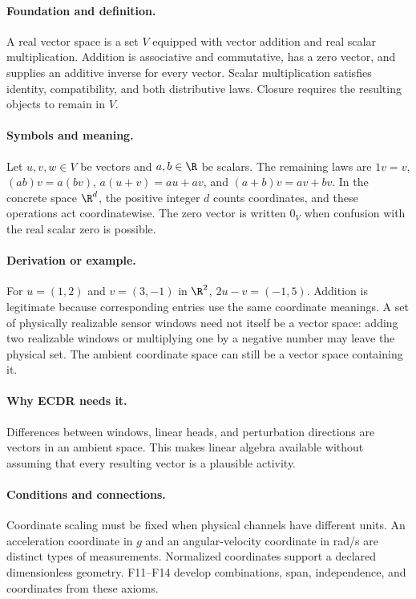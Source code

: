 \paragraph{Foundation and definition.}
A real vector space is a set $V$ equipped with vector addition and real
scalar multiplication. Addition is associative and commutative, has a
zero vector, and supplies an additive inverse for every vector. Scalar
multiplication satisfies identity, compatibility, and both distributive
laws. Closure requires the resulting objects to remain in $V$.
\paragraph{Symbols and meaning.}
Let $u,v,w\in V$ be vectors and $a,b\in\R$ be scalars. The remaining
laws are $1v=v$, $(ab)v=a(bv)$,
$a(u+v)=au+av$, and $(a+b)v=av+bv$. In the concrete space $\R^d$,
the positive integer $d$ counts coordinates, and these operations act
coordinatewise. The zero vector is written $0_V$ when confusion with
the real scalar zero is possible.
\paragraph{Derivation or example.}
For $u=(1,2)$ and $v=(3,-1)$ in $\R^2$,
$2u-v=(-1,5)$. Addition is legitimate because corresponding entries use
the same coordinate meanings. A set of physically realizable sensor
windows need not itself be a vector space: adding two realizable windows
or multiplying one by a negative number may leave the physical set.
The ambient coordinate space can still be a vector space containing it.
\paragraph{Why ECDR needs it.}
Differences between windows, linear heads, and perturbation directions
are vectors in an ambient space. This makes linear algebra available
without assuming that every resulting vector is a plausible activity.
\paragraph{Conditions and connections.}
Coordinate scaling must be fixed when physical channels have different
units. An acceleration coordinate in $g$ and an angular-velocity coordinate
in rad/s are distinct types of measurements. Normalized coordinates
support a declared dimensionless geometry. F11--F14 develop combinations,
span, independence, and coordinates from these axioms.

